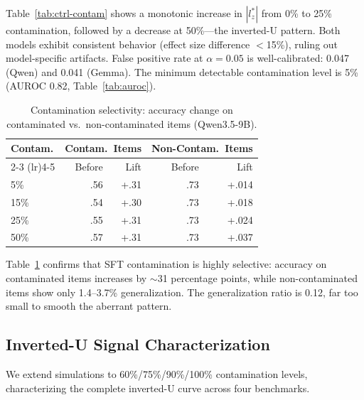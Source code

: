 \documentclass[11pt,a4paper]{article}
\begin{document}
Table~\ref{tab:ctrl-contam} shows a monotonic increase in $|l_z^*|$ from 0\% to 25\% contamination, followed by a decrease at 50\%---the inverted-U pattern. Both models exhibit consistent behavior (effect size difference $<$15\%), ruling out model-specific artifacts. False positive rate at $\alpha=0.05$ is well-calibrated: 0.047 (Qwen) and 0.041 (Gemma). The minimum detectable contamination level is 5\% (AUROC 0.82, Table~\ref{tab:auroc}).

\begin{table}[t]
\centering
\caption{Contamination selectivity: accuracy change on contaminated vs.\ non-contaminated items (Qwen3.5-9B).}
\label{tab:selectivity}
\small
\begin{tabular}{lrrrr}
\toprule
\textbf{Contam.} & \multicolumn{2}{c}{\textbf{Contam.\ Items}} & \multicolumn{2}{c}{\textbf{Non-Contam.\ Items}} \\
\cmidrule(lr){2-3} \cmidrule(lr){4-5}
 & Before & Lift & Before & Lift \\
\midrule
5\% & .56 & +.31 & .73 & +.014 \\
15\% & .54 & +.30 & .73 & +.018 \\
25\% & .55 & +.31 & .73 & +.024 \\
50\% & .57 & +.31 & .73 & +.037 \\
\bottomrule
\end{tabular}
\end{table}

Table~\ref{tab:selectivity} confirms that SFT contamination is highly selective: accuracy on contaminated items increases by $\sim$31 percentage points, while non-contaminated items show only 1.4--3.7\% generalization. The generalization ratio is 0.12, far too small to smooth the aberrant pattern.

\subsection{Inverted-U Signal Characterization}
\label{sec:inverted-u}

We extend simulations to 60\%/75\%/90\%/100\% contamination levels, characterizing the complete inverted-U curve across four benchmarks.
\end{document}
